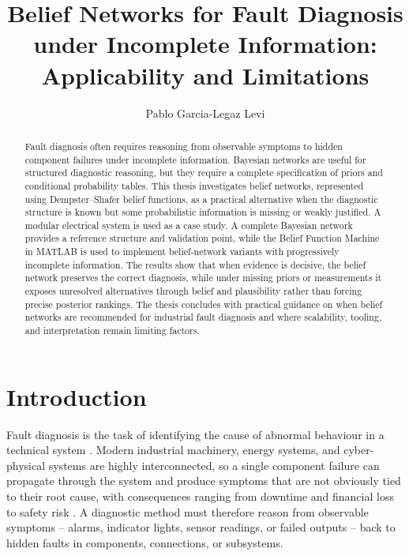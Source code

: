 \documentclass[runningheads]{llncs}
\begin{document}
\title{Belief Networks for Fault Diagnosis under Incomplete Information: Applicability and Limitations}

\author{Pablo Garcia-Legaz Levi}


\maketitle

\begin{abstract}
Fault diagnosis often requires reasoning from observable symptoms to hidden component failures under incomplete information. Bayesian networks are useful for structured diagnostic reasoning, but they require a complete specification of priors and conditional probability tables. This thesis investigates belief networks, represented using Dempster--Shafer belief functions, as a practical alternative when the diagnostic structure is known but some probabilistic information is missing or weakly justified. A modular electrical system is used as a case study. A complete Bayesian network provides a reference structure and validation point, while the Belief Function Machine in MATLAB is used to implement belief-network variants with progressively incomplete information. The results show that when evidence is decisive, the belief network preserves the correct diagnosis, while under missing priors or measurements it exposes unresolved alternatives through belief and plausibility rather than forcing precise posterior rankings. The thesis concludes with practical guidance on when belief networks are recommended for industrial fault diagnosis and where scalability, tooling, and interpretation remain limiting factors.

\end{abstract}


\section{Introduction}
\label{sec:introduction}

Fault diagnosis is the task of identifying the cause of abnormal behaviour in a technical system \cite{Isermann2006}. Modern industrial machinery, energy systems, and cyber-physical systems are highly interconnected, so a single component failure can propagate through the system and produce symptoms that are not obviously tied to their root cause, with consequences ranging from downtime and financial loss to safety risk \cite{Venkatasubramanian2003PartI,GaoCecatiDing2015PartII}. A diagnostic method must therefore reason from observable symptoms -- alarms, indicator lights, sensor readings, or failed outputs -- back to hidden faults in components, connections, or subsystems.
\end{document}
